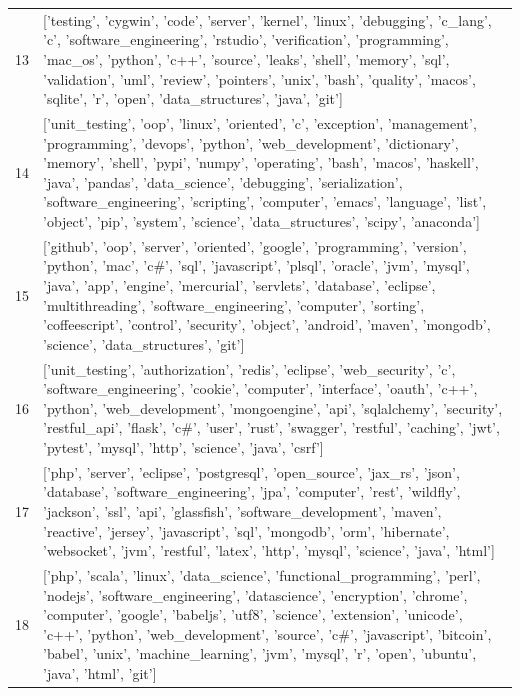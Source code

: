 \begin{center}
\begin{longtable}{|p{1.5cm}|p{12.5cm}|}
            13 & ['testing', 'cygwin', 'code', 'server', 'kernel', 'linux', 'debugging', 'c\_lang', 'c', 'software\_engineering', 'rstudio', 'verification', 'programming', 'mac\_os', 'python', 'c++', 'source', 'leaks', 'shell', 'memory', 'sql', 'validation', 'uml', 'review', 'pointers', 'unix', 'bash', 'quality', 'macos', 'sqlite', 'r', 'open', 'data\_structures', 'java', 'git']  \\ 
            14 & ['unit\_testing', 'oop', 'linux', 'oriented', 'c', 'exception', 'management', 'programming', 'devops', 'python', 'web\_development', 'dictionary', 'memory', 'shell', 'pypi', 'numpy', 'operating', 'bash', 'macos', 'haskell', 'java', 'pandas', 'data\_science', 'debugging', 'serialization', 'software\_engineering', 'scripting', 'computer', 'emacs', 'language', 'list', 'object', 'pip', 'system', 'science', 'data\_structures', 'scipy', 'anaconda']  \\ 
            15 & ['github', 'oop', 'server', 'oriented', 'google', 'programming', 'version', 'python', 'mac', 'c\#', 'sql', 'javascript', 'plsql', 'oracle', 'jvm', 'mysql', 'java', 'app', 'engine', 'mercurial', 'servlets', 'database', 'eclipse', 'multithreading', 'software\_engineering', 'computer', 'sorting', 'coffeescript', 'control', 'security', 'object', 'android', 'maven', 'mongodb', 'science', 'data\_structures', 'git']  \\ 
            16 & ['unit\_testing', 'authorization', 'redis', 'eclipse', 'web\_security', 'c', 'software\_engineering', 'cookie', 'computer', 'interface', 'oauth', 'c++', 'python', 'web\_development', 'mongoengine', 'api', 'sqlalchemy', 'security', 'restful\_api', 'flask', 'c\#', 'user', 'rust', 'swagger', 'restful', 'caching', 'jwt', 'pytest', 'mysql', 'http', 'science', 'java', 'csrf']  \\ 
            17 & ['php', 'server', 'eclipse', 'postgresql', 'open\_source', 'jax\_rs', 'json', 'database', 'software\_engineering', 'jpa', 'computer', 'rest', 'wildfly', 'jackson', 'ssl', 'api', 'glassfish', 'software\_development', 'maven', 'reactive', 'jersey', 'javascript', 'sql', 'mongodb', 'orm', 'hibernate', 'websocket', 'jvm', 'restful', 'latex', 'http', 'mysql', 'science', 'java', 'html']  \\ 
            18 & ['php', 'scala', 'linux', 'data\_science', 'functional\_programming', 'perl', 'nodejs', 'software\_engineering', 'datascience', 'encryption', 'chrome', 'computer', 'google', 'babeljs', 'utf8', 'science', 'extension', 'unicode', 'c++', 'python', 'web\_development', 'source', 'c\#', 'javascript', 'bitcoin', 'babel', 'unix', 'machine\_learning', 'jvm', 'mysql', 'r', 'open', 'ubuntu', 'java', 'html', 'git']  \\ 

\end{longtable}
\end{center}
